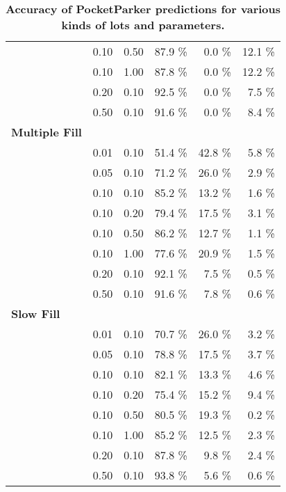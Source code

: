 \begin{table}[t!]
\begin{threeparttable}
{\begin{tabularx}{\columnwidth}{Xrrrrr}
& 0.10 & 0.50 & 87.9 \% & 0.0 \% & 12.1 \% \\
& 0.10 & 1.00 & 87.8 \% & 0.0 \% & 12.2 \% \\
& 0.20 & 0.10 & 92.5 \% & 0.0 \% & 7.5 \% \\
& 0.50 & 0.10 & 91.6 \% & 0.0 \% & 8.4 \% \\
\textbf{Multiple Fill} & & & & & \\
\midrule
& 0.01 & 0.10 & 51.4 \% & 42.8 \% & 5.8 \% \\
& 0.05 & 0.10 & 71.2 \% & 26.0 \% & 2.9 \% \\
& 0.10 & 0.10 & 85.2 \% & 13.2 \% & 1.6 \% \\
& 0.10 & 0.20 & 79.4 \% & 17.5 \% & 3.1 \% \\
& 0.10 & 0.50 & 86.2 \% & 12.7 \% & 1.1 \% \\
& 0.10 & 1.00 & 77.6 \% & 20.9 \% & 1.5 \% \\
& 0.20 & 0.10 & 92.1 \% & 7.5 \% & 0.5 \% \\
& 0.50 & 0.10 & 91.6 \% & 7.8 \% & 0.6 \% \\
\textbf{Slow Fill} & & & & & \\
\midrule
& 0.01 & 0.10 & 70.7 \% & 26.0 \% & 3.2 \% \\
& 0.05 & 0.10 & 78.8 \% & 17.5 \% & 3.7 \% \\
& 0.10 & 0.10 & 82.1 \% & 13.3 \% & 4.6 \% \\
& 0.10 & 0.20 & 75.4 \% & 15.2 \% & 9.4 \% \\
& 0.10 & 0.50 & 80.5 \% & 19.3 \% & 0.2 \% \\
& 0.10 & 1.00 & 85.2 \% & 12.5 \% & 2.3 \% \\
& 0.20 & 0.10 & 87.8 \% & 9.8 \% & 2.4 \% \\
& 0.50 & 0.10 & 93.8 \% & 5.6 \% & 0.6 \% \\
\end{tabularx}
}
\caption{\textbf{Accuracy of PocketParker predictions for various kinds of lots and parameters.}}
\label{table-accuracy}
\end{threeparttable}
\end{table}
